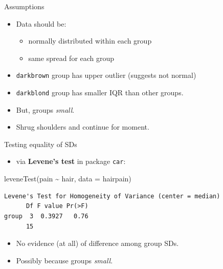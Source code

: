 \documentclass[
  ignorenonframetext,
]{beamer}
\newenvironment{Shaded}{\begin{snugshade}}{\end{snugshade}}
\newcommand{\AttributeTok}[1]{\textcolor[rgb]{0.40,0.45,0.13}{#1}}
\newcommand{\FunctionTok}[1]{\textcolor[rgb]{0.28,0.35,0.67}{#1}}
\newcommand{\NormalTok}[1]{\textcolor[rgb]{0.00,0.23,0.31}{#1}}
\newcommand{\SpecialCharTok}[1]{\textcolor[rgb]{0.37,0.37,0.37}{#1}}
\providecommand{\tightlist}{%
  \setlength{\itemsep}{0pt}\setlength{\parskip}{0pt}}\usepackage{longtable,booktabs,array}
\begin{document}
\begin{frame}[fragile]{Assumptions}
\protect\hypertarget{assumptions}{}
\begin{itemize}
\item
  Data should be:

  \begin{itemize}
  \item
    normally distributed within each group
  \item
    same spread for each group
  \end{itemize}
\item
  \texttt{darkbrown} group has upper outlier (suggests not normal)
\item
  \texttt{darkblond} group has smaller IQR than other groups.
\item
  But, groups \emph{small}.
\item
  Shrug shoulders and continue for moment.
\end{itemize}
\end{frame}

\begin{frame}[fragile]{Testing equality of SDs}
\protect\hypertarget{testing-equality-of-sds}{}
\begin{itemize}
\tightlist
\item
  via \textbf{Levene's test} in package \texttt{car}:
\end{itemize}

\small

\begin{Shaded}
\begin{Highlighting}[]
\FunctionTok{leveneTest}\NormalTok{(pain }\SpecialCharTok{\textasciitilde{}}\NormalTok{ hair, }\AttributeTok{data =}\NormalTok{ hairpain)}
\end{Highlighting}
\end{Shaded}

\begin{verbatim}
Levene's Test for Homogeneity of Variance (center = median)
      Df F value Pr(>F)
group  3  0.3927   0.76
      15               
\end{verbatim}

\normalsize

\begin{itemize}
\item
  No evidence (at all) of difference among group SDs.
\item
  Possibly because groups \emph{small}.
\end{itemize}
\end{frame}
\end{document}
